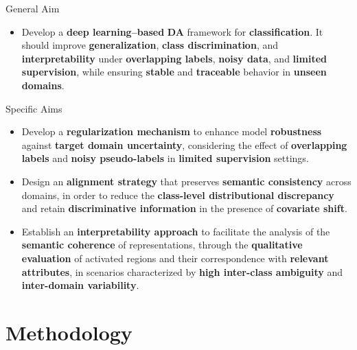 \documentclass[aspectratio=169]{beamer}
\begin{document}
\begin{frame}{General Aim}

   \begin{itemize}
\justifying
   \item Develop a \textbf{deep learning–based} \textbf{DA} framework for \textbf{classification}. It should improve \textbf{generalization}, \textbf{class discrimination}, and \textbf{interpretability} under \textbf{overlapping labels}, \textbf{noisy data}, and \textbf{limited supervision}, while ensuring \textbf{stable} and \textbf{traceable} behavior in \textbf{unseen domains}.

   \end{itemize}
\end{frame}



\begin{frame}{Specific Aims}
   \begin{itemize}
    \setlength\itemsep{2em}
\justifying
     \item[1] Develop a \textbf{regularization mechanism} to enhance model \textbf{robustness} against \textbf{target domain uncertainty}, considering the effect of \textbf{overlapping labels} and \textbf{noisy pseudo-labels} in \textbf{limited supervision} settings.
     
     \item[2] Design an \textbf{alignment strategy} that preserves \textbf{semantic consistency} across domains, in order to reduce the \textbf{class-level distributional discrepancy} and retain \textbf{discriminative information} in the presence of \textbf{covariate shift}.
     
     \item[3] Establish an \textbf{interpretability approach} to facilitate the analysis of the \textbf{semantic coherence} of representations, through the \textbf{qualitative evaluation} of activated regions and their correspondence with \textbf{relevant attributes}, in scenarios characterized by \textbf{high inter-class ambiguity} and \textbf{inter-domain variability}.
    
   \end{itemize}   
\end{frame}

\section{Methodology}
\end{document}
